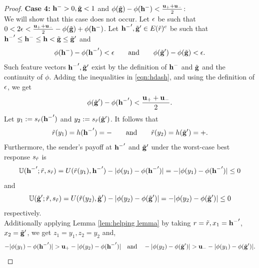 \begin{proof}
\textbf{Case 4: }{$\mathbf{h^{-}} > 0, \tilde{\mathbf{g}} < 1$ and $\phi(\tilde{\mathbf{g}}) - \phi(\mathbf{h^{-}}) < \frac{\mathbf{u_+} + \mathbf{u_-}}{2}$:}\\
	We will show that this case does not occur. Let $\epsilon$ be such that
	$0 < 2\epsilon < \frac{\mathbf{u_+} + \mathbf{u_-}}{2} -  \phi(\tilde{\mathbf{g}}) + \phi(\mathbf{h^{-}})$. Let
	$\mathbf{h^{-}}', \tilde{\mathbf{g}}' \in E(\tilde{r})^c$ be such that $\mathbf{h^{-}}' \leq \mathbf{h^{-}} \leq \mathbf{h} < \tilde{\mathbf{g}} \leq \tilde{\mathbf{g}}'$ and
	\begin{equation}\label{eqn:hdash}
		\phi(\mathbf{h^{-}}) - \phi(\mathbf{h^{-}}') < \epsilon \quad \hbox{\quad and\quad} \quad \phi(\tilde{\mathbf{g}}') - \phi(\tilde{\mathbf{g}}) < \epsilon.
	\end{equation}
	Such feature vectors $\mathbf{h^{-}}', \tilde{\mathbf{g}}'$ exist by the definition of $\mathbf{h^{-}}$ and $\tilde{\mathbf{g}}$ and the continuity of $\phi$. Adding the inequalities in \eqref{eqn:hdash}, and using the definition of $\epsilon$, we get
	\begin{equation}\label{eqn:gap between g and h}
		\phi(\tilde{\mathbf{g}}') - \phi(\mathbf{h^{-}}') < \frac{\mathbf{u_+} + \mathbf{u_-} }{2}.
	\end{equation}
	Let $y_1 := s_{\tilde{r}}(\mathbf{h^{-}}')$ and $y_2 := s_{\tilde{r}}(\tilde{\mathbf{g}}')$. It follows that
	\begin{equation}\label{eqn:rt at y1 y2}
		\tilde{r}(y_1) = h(\mathbf{h^{-}}') = \mathbf{-} \quad \hbox{\quad and\quad} \quad \tilde{r}(y_2) = h(\tilde{\mathbf{g}}') = \mathbf{+}.
	\end{equation}
	Furthermore, the sender's payoff at $\mathbf{h^{-}}'$ and $\tilde{\mathbf{g}}'$ under the worst-case best response $s_{\tilde{r}}$ is
	\begin{equation}\label{eqn:y_1 best response payoff}
		\mathbb{U}(\mathbf{h^{-}}'; \tilde{r}, s_{\tilde{r}}) = U(\tilde{r}(y_1), \mathbf{h^{-}}') - |\phi(y_1) - \phi(\mathbf{h^{-}}')| = - |\phi(y_1) - \phi(\mathbf{h^{-}}')| \leq 0
	\end{equation}
	and
	\begin{equation}\label{eqn:y_2 best response payoff}
		\mathbb{U}(\tilde{\mathbf{g}}'; \tilde{r}, s_{\tilde{r}}) = U(\tilde{r}(y_2), \tilde{\mathbf{g}}') - |\phi(y_2) - \phi(\tilde{\mathbf{g}}')| = - |\phi(y_2) - \phi(\tilde{\mathbf{g}}')| \leq 0
	\end{equation}
	respectively.\\
Additionally applying Lemma \ref{lem:helping lemma} by taking $r = \tilde{r}, x_1 = \mathbf{h^{-}}'$, $x_2 = \tilde{\mathbf{g}}'$, we get $z_1 = y_1, z_2 = y_2$ and,
	\begin{equation}\label{eqn:s hat bad}
	-|\phi(y_1) - \phi(\mathbf{h^{-}}')| > \mathbf{u_+} -|\phi(y_2) - \phi(\mathbf{h^{-}}')| \hbox{\quad and\quad} -|\phi(y_2) - \phi(\tilde{\mathbf{g}}')| > \mathbf{u_-} - |\phi(y_1) - \phi(\tilde{\mathbf{g}}')|.
\end{equation}




\end{proof}
